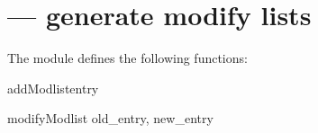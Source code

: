 
\section{ ---
  generate modify lists }

The  module defines the following functions:

\begin{funcdesc}{addModlist}{entry } %
\end{funcdesc}

\begin{funcdesc}{modifyModlist}{ old_entry, new_entry } %
\end{funcdesc}

